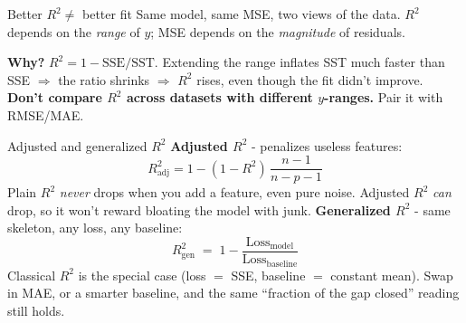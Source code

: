 \documentclass[aspectratio=169]{beamer}
\begin{document}
\begin{frame}{Better $R^2 \neq$ better fit}
  Same model, same MSE, two views of the data. $R^2$ depends on the \emph{range} of $y$; MSE depends on the \emph{magnitude} of residuals.
  \vfill
  \begin{center}
  \end{center}
  \vfill
  \footnotesize \textbf{Why?} $R^2 = 1 - \text{SSE}/\text{SST}$. Extending the range inflates SST much faster than SSE $\Rightarrow$ the ratio shrinks $\Rightarrow$ $R^2$ rises, even though the fit didn't improve. \textbf{Don't compare $R^2$ across datasets with different $y$-ranges.} Pair it with RMSE/MAE.
\end{frame}

\begin{frame}{Adjusted and generalized $R^2$}
  \textbf{Adjusted $R^2$} - penalizes useless features:
  \[
    R^2_\text{adj} = 1 - (1 - R^2)\, \frac{n-1}{n-p-1}
  \]
  Plain $R^2$ \emph{never} drops when you add a feature, even pure noise. Adjusted $R^2$ \emph{can} drop, so it won't reward bloating the model with junk.
  \vfill
  \textbf{Generalized $R^2$} - same skeleton, any loss, any baseline:
  \[
    R^2_\text{gen} \;=\; 1 - \frac{\text{Loss}_\text{model}}{\text{Loss}_\text{baseline}}
  \]
  Classical $R^2$ is the special case (loss $=$ SSE, baseline $=$ constant mean). Swap in MAE, or a smarter baseline, and the same ``fraction of the gap closed'' reading still holds.
\end{frame}
\end{document}
